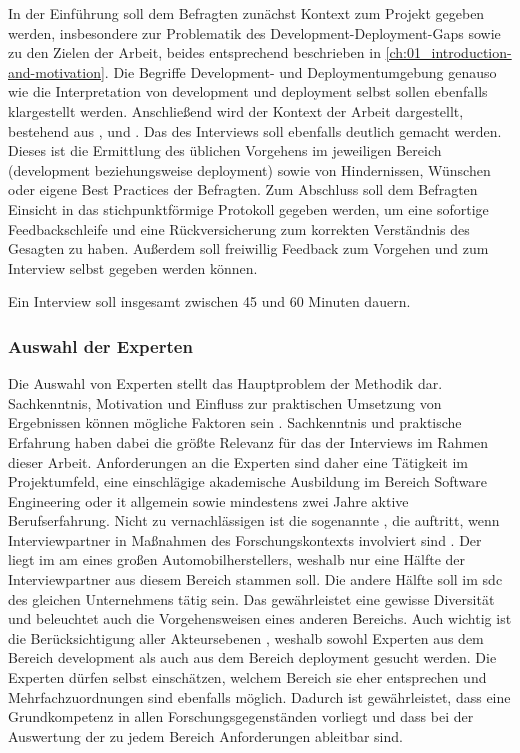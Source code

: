In der Einführung soll dem Befragten zunächst Kontext zum Projekt gegeben werden, insbesondere zur Problematik des Development-Deployment-Gaps sowie zu den Zielen der Arbeit, beides entsprechend beschrieben in \autoref{ch:01_introduction-and-motivation}. Die Begriffe Development- und Deploymentumgebung genauso wie die Interpretation von \Gls{development} und \Gls{deployment} selbst sollen ebenfalls klargestellt werden. Anschließend wird der Kontext der Arbeit dargestellt, bestehend aus ,  und . Das  des Interviews soll ebenfalls deutlich gemacht werden. Dieses ist die Ermittlung des üblichen Vorgehens im jeweiligen Bereich (\Gls{development} beziehungsweise \Gls{deployment}) sowie von Hindernissen, Wünschen oder eigene Best Practices der Befragten. Zum Abschluss soll dem Befragten Einsicht in das stichpunktförmige Protokoll gegeben werden, um eine sofortige Feedbackschleife und eine Rückversicherung zum korrekten Verständnis des Gesagten zu haben. Außerdem soll freiwillig Feedback zum Vorgehen und zum Interview selbst gegeben werden können.

Ein Interview soll insgesamt zwischen 45 und 60 Minuten dauern.

\subsubsection{Auswahl der Experten}
\label{subsubsec:04-01-02-03_selection-of-experts}

Die Auswahl von Experten stellt das Hauptproblem der Methodik dar. Sachkenntnis, Motivation und Einfluss zur praktischen Umsetzung von Ergebnissen können mögliche Faktoren sein \cite{401:Das-Experteninterview}. Sachkenntnis und praktische Erfahrung haben dabei die größte Relevanz für das  der Interviews im Rahmen dieser Arbeit. Anforderungen an die Experten sind daher eine Tätigkeit im Projektumfeld, eine einschlägige akademische Ausbildung im Bereich Software Engineering oder \Gls{it} allgemein sowie mindestens zwei Jahre aktive Berufserfahrung. Nicht zu vernachlässigen ist die sogenannte , die auftritt, wenn Interviewpartner in Maßnahmen des Forschungskontexts involviert sind \cite{401:Das-Experteninterview}. Der  liegt im \Gls{am} eines großen Automobilherstellers, weshalb nur eine Hälfte der Interviewpartner aus diesem Bereich stammen soll. Die andere Hälfte soll im \Gls{sdc} des gleichen Unternehmens tätig sein. Das gewährleistet eine gewisse Diversität und beleuchtet auch die Vorgehensweisen eines anderen Bereichs. Auch wichtig ist die Berücksichtigung aller Akteursebenen \cite{401:Das-Experteninterview}, weshalb sowohl Experten aus dem Bereich \Gls{development} als auch aus dem Bereich \Gls{deployment} gesucht werden. Die Experten dürfen selbst einschätzen, welchem Bereich sie eher entsprechen und Mehrfachzuordnungen sind ebenfalls möglich. Dadurch ist gewährleistet, dass eine Grundkompetenz in allen Forschungsgegenständen vorliegt und dass bei der Auswertung der  zu jedem Bereich Anforderungen ableitbar sind.

